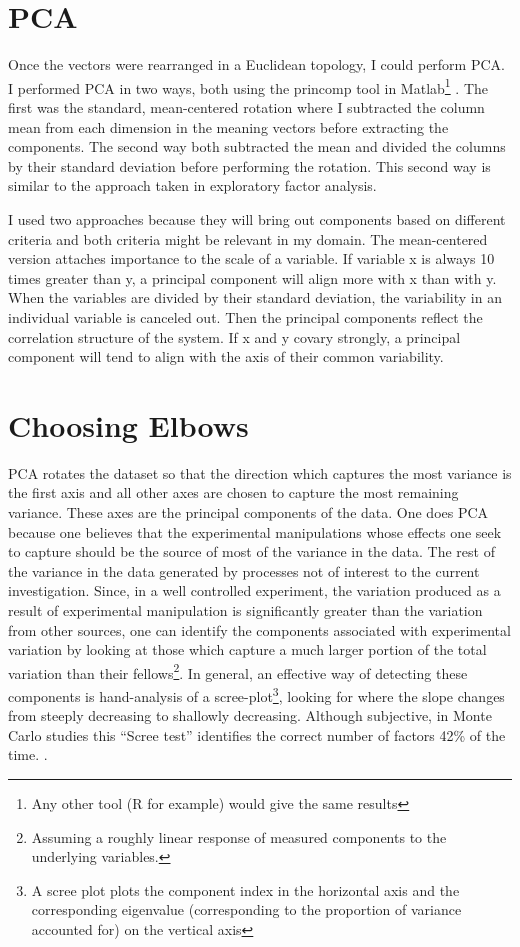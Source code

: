 \section{PCA}

Once the vectors were rearranged in a Euclidean topology, I could perform PCA. I 
performed PCA in two ways, both using the princomp tool in Matlab\footnote{Any 
other tool (R for example) would give the same results} \citep{Matlab2012a}. The 
first was the standard, mean-centered rotation where I subtracted the column 
mean from each dimension in the meaning vectors before extracting the 
components. The second way both subtracted the mean and divided the columns by 
their standard deviation before performing the rotation. This second way is 
similar to the approach taken in exploratory factor analysis. 

I used two approaches because they will bring out components based on different 
criteria and both criteria might be relevant in my domain. The mean-centered 
version attaches importance to the scale of a variable. If variable x is always 
10 times greater than y, a principal component will align more with x than with 
y. When the variables are divided by their standard 
deviation, the variability in an individual variable is canceled out. Then the 
principal components reflect the correlation structure of the system. If x and y 
covary strongly, a principal component will tend to align with the axis of their 
common variability.

\section{Choosing Elbows}

PCA rotates the dataset so that the direction which captures the most
variance is the first axis and all other axes are chosen to capture
the most remaining variance. These axes are the principal components
of the data. One does PCA because one believes that the experimental
manipulations whose effects one seek to capture should be the source
of most of the variance in the data. The rest of the variance in the
data generated by processes not of interest to the current
investigation. Since, in a well controlled experiment, the variation
produced as a result of experimental manipulation is significantly
greater than the variation from other sources, one can identify the
components associated with experimental variation by looking at those
which capture a much larger portion of the total variation than their
fellows\footnote{Assuming a roughly linear response of measured
  components to the underlying variables.}. In general, an effective
way of detecting these components is hand-analysis of a
scree-plot\footnote{A scree plot plots the component index in the
  horizontal axis and the corresponding eigenvalue (corresponding to
  the proportion of variance accounted for) on the vertical axis},
looking for where the slope changes from steeply decreasing to
shallowly decreasing. Although subjective, in Monte Carlo studies this
``Scree test'' identifies the correct number of factors 42\% of the
time. \citep{Zwick1986}.

